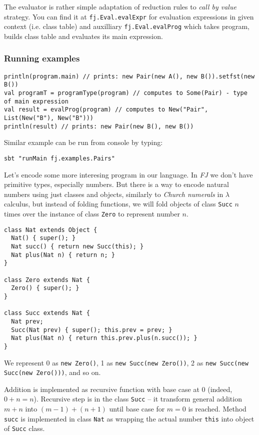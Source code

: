 \documentclass{article}[12pt]
\begin{document}
The evaluator is rather simple adaptation of reduction rules to
\emph{call by value} strategy. You can find it at
\texttt{fj.Eval.evalExpr} for evaluation expressions in given
context (i.e. class table) and auxilliary \texttt{fj.Eval.evalProg}
which takes program, builds class table and evaluates its
main expression.

\subsubsection{Running examples}

\begin{verbatim}
println(program.main) // prints: new Pair(new A(), new B()).setfst(new B())
val programT = programType(program) // computes to Some(Pair) - type of main expression
val result = evalProg(program) // computes to New("Pair", List(New("B"), New("B")))
println(result) // prints: new Pair(new B(), new B())
\end{verbatim}
Similar example can be run from console by typing:

\begin{verbatim}
sbt "runMain fj.examples.Pairs"
\end{verbatim}

Let's encode some more interesing program in our language. In
\emph{FJ} we don't have primitive types, especially numbers.
But there is a way to encode natural numbers using just classes
and objects, similarly to \emph{Church numerals} in $\lambda$
calculus, but instead of folding functions, we will fold objects
of class \texttt{Succ} $n$ times over the instance of class
\texttt{Zero} to represent number $n$.

\begin{verbatim}
class Nat extends Object {
  Nat() { super(); }
  Nat succ() { return new Succ(this); }
  Nat plus(Nat n) { return n; }
}

class Zero extends Nat { 
  Zero() { super(); }
}

class Succ extends Nat {
  Nat prev;
  Succ(Nat prev) { super(); this.prev = prev; }
  Nat plus(Nat n) { return this.prev.plus(n.succ()); }
}
\end{verbatim}

We represent 0 as \texttt{new Zero()},
1 as \texttt{new Succ(new Zero())},
2 as \texttt{new Succ(new Succ(new Zero()))}, and so on.

Addition is implemented as recursive function with base case
at 0 (indeed, $0 + n = n$). Recursive step is in the class
\texttt{Succ} -- it transform general addition $m + n$ into
$(m-1) + (n+1)$ until base case for $m = 0$ is reached.
Method \texttt{succ} is implemented in class \texttt{Nat} as
wrapping the actual number \texttt{this} into object of
\texttt{Succ} class.
\end{document}
